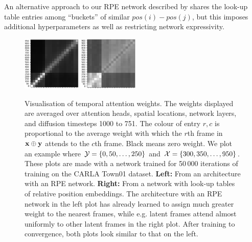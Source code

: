 An alternative approach to our RPE network described by \citet{wu2021rethinking} shares the look-up table entries among ``buckets'' of similar $pos(i)-pos(j)$, but this imposes additional hyperparameters as well as restricting network expressivity.

\begin{figure}
    \centering
    \includegraphics[width=0.25\textwidth]{figs/fdm/attn_masks/w_rpe.png}
    \includegraphics[width=0.25\textwidth]{figs/fdm/attn_masks/wo_rpe.png}
    \caption{Visualisation of temporal attention weights. The weights displayed are averaged over attention heads, spatial locations, network layers, and diffusion timesteps 1000 to 751. The colour of entry $r,c$ is proportional to the average weight with which the $r$th frame in ${\mathbf{x}}\oplus{\mathbf{y}}$ attends to the $c$th frame. Black means zero weight. We plot an example where $\mathcal{Y}=\{0,50,\ldots,250\}$ and $\mathcal{X}=\{300, 350,\ldots,950\}$. These plots are made with a network trained for 50\,000 iterations of training on the CARLA Town01 dataset. \textbf{Left:} From an architecture with an RPE network. \textbf{Right:} From a network with look-up tables of relative position embeddings. The architecture with an RPE network in the left plot has already learned to assign much greater weight to the nearest frames, while e.g. latent frames attend almost uniformly to other latent frames in the right plot. After training to convergence, both plots look similar to that on the left.  }
    \label{fig:fdm-rpe-net-attn-weights}
\end{figure}



